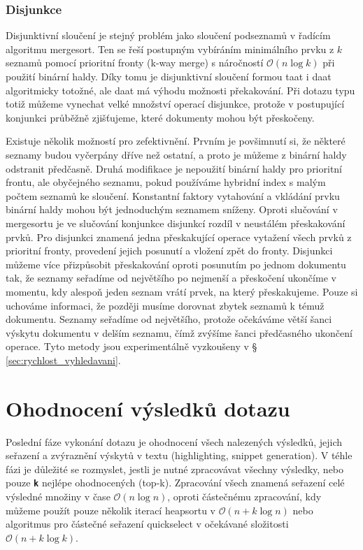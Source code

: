 \documentclass[11pt,letterpaper,oneside,openright]{book}
\newcommand{\bftt}[1]{\texttt{\textbf{#1}}}
\begin{document}
\subsubsection{Disjunkce}
Disjunktivní sloučení je stejný problém jako sloučení podseznamů v řadícím
algoritmu mergesort. Ten se řeší postupným vybíráním minimálního prvku z $k$
seznamů pomocí prioritní fronty (k-way merge) s náročností $\mathcal{O}(n \log
k)$ při použití binární haldy. Díky tomu je disjunktivní sloučení formou taat i
daat algoritmicky totožné, ale daat má výhodu možnosti překakování. Při dotazu
typu  totiž můžeme vynechat velké množství operací
disjunkce, protože v postupující konjunkci průběžně zjišťujeme, které dokumenty
mohou být přeskočeny.

Existuje několik možností pro zefektivnění. Prvním je povšimnutí si, že některé
seznamy budou vyčerpány dříve než ostatní, a proto je můžeme z binární haldy
odstranit předčasně. Druhá modifikace je nepoužití binární haldy pro prioritní
frontu, ale obyčejného seznamu, pokud používáme hybridní index s malým počtem
seznamů ke sloučení. Konstantní faktory vytahování a vkládání prvku binární
haldy mohou být jednoduchým seznamem sníženy. Oproti slučování v mergesortu je
ve slučování konjunkce disjunkcí rozdíl v neustálém přeskakování prvků. Pro
disjunkci znamená jedna přeskakující operace vytažení všech prvků z prioritní
fronty, provedení jejich posunutí a vložení zpět do fronty. Disjunkci můžeme
více přizpůsobit přeskakování oproti posunutím po jednom dokumentu tak, že
seznamy seřadíme od největšího po nejmenší a přeskočení ukončíme v momentu, kdy
alespoň jeden seznam vrátí prvek, na který přeskakujeme. Pouze si uchováme
informaci, že později musíme dorovnat zbytek seznamů k témuž dokumentu. Seznamy
seřadíme od největšího, protože očekáváme větší šanci výskytu dokumentu v
delším seznamu, čímž zvýšíme šanci předčasného ukončení operace. Tyto metody
jsou experimentálně vyzkoušeny v \S\,\ref{sec:rychlost_vyhledavani}.




\section{Ohodnocení výsledků dotazu}
Poslední fáze vykonání dotazu je ohodnocení všech nalezených výsledků, jejich
seřazení a zvýraznění výskytů v textu (highlighting, snippet generation). V
téhle fázi je důležité se rozmyslet, jestli je nutné zpracovávat všechny
výsledky, nebo pouze \bftt{k} nejlépe ohodnocených (top-k). Zpracování všech
znamená seřazení celé výsledné množiny v čase $\mathcal{O}(n \log n)$, oproti
částečnému zpracování, kdy můžeme použít pouze několik iterací heapsortu v
$\mathcal{O}(n + k \log n)$ nebo algoritmus pro částečné seřazení quickselect v
očekávané složitosti $\mathcal{O}(n + k \log k)$.
\end{document}
